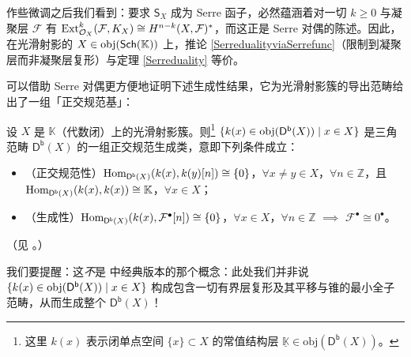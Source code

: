 
作些微调之后我们看到：要求 $\mathsf{S}_X$ 成为 Serre 函子，必然蕴涵着对一切 $k\geq 0$ 与凝聚层 $\mathcal{F}$ 有 $\textup{Ext}_{\mathcal{O}_X}^k(\mathcal{F},K_X)\cong H^{n-k}(X,\mathcal{F})^*$，而这正是 Serre 对偶的陈述。因此，在光滑射影的 $X\in\textup{obj}(\mathsf{Sch}(\mathbb{K}))$ 上，推论 \ref{SerredualityviaSerrefunc}（限制到凝聚层而非凝聚层复形）与定理 \ref{Serreduality} 等价。

可以借助 Serre 对偶更方便地证明下述生成性结果，它为光滑射影簇的导出范畴给出了一组「正交规范基」：

\begin{Pro}\label{spanningclass}
	设 $X$ 是 $\mathbb{K}$（代数闭）上的光滑射影簇。则\footnote{这里 $k(x)$ 表示闭单点空间 $\{x\}\subset X$ 的常值结构层 $\underline{\mathbb{K}}\in\text{obj}(\mathsf{D^b}(X))$。} $\{k(x)\in\textup{obj}(\mathsf{D^b}(X))\mid x\in X\}$ 是三角范畴 $\mathsf{D^b}(X)$ 的一组\textup{正交规范生成类}，意即下列条件成立：
	\begin{itemize}[leftmargin=0.5cm]
		\item（正交规范性）$\textup{Hom}_{\mathsf{D^b}(X)}(k(x),k(y)[n])\cong\{0\}$，$\forall x\neq y\in X$，$\forall n\in\mathbb{Z}$，且 $\textup{Hom}_{\mathsf{D^b}(X)}(k(x),k(x))\cong\mathbb{K}$，$\forall x\in X$；

		\item（生成性）$\textup{Hom}_{\mathsf{D^b}(X)}(k(x),\mathcal{F}^\bullet[n])\cong\{0\}$，$\forall x\in X$，$\forall n\in\mathbb{Z}$ $\implies$ $\mathcal{F}^\bullet\cong 0^\bullet$。
	\end{itemize}
	（见 \textup{\cite[命题 3.17]{[Huy06]}}。）
\end{Pro}

我们要提醒：这\textit{不}是 \cite[定义 3.22]{[Imp21]} 中经典版本的那个概念：此处我们并非说 $\{k(x)\in\textup{obj}(\mathsf{D^b}(X))\mid x\in X\}$ 构成包含一切有界层复形及其平移与锥的最小全子范畴，从而生成整个 $\mathsf{D^b}(X)$！

